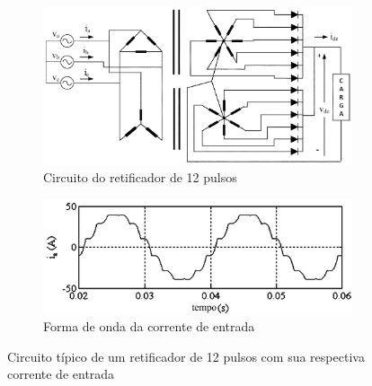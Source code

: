 \begin{figure}[!htbp] %
	\centering
	\begin{subfigure}[b]{0.49\textwidth}
		\centering
		\includegraphics[width=\textwidth]{Cap2/Figuras/12_pulse_rectifier.png}
		\caption{Circuito do retificador de 12 pulsos \cite{Singh2008}} 
		\label{fig:12_pulse_rectifier}
	\end{subfigure}%
	\hfill
	\begin{subfigure}[b]{0.49\textwidth}  
		\centering 
		\includegraphics[width=\textwidth]{Cap2/Figuras/12_pulse_wave.png}
		\caption{Forma de onda da corrente de entrada \cite{Singh2008}}    
		\label{fig:12_pulse_wave}
	\end{subfigure}%
	\caption{Circuito típico de um retificador de 12 pulsos com sua respectiva corrente de entrada}
	\label{fig:12_pulse}
\end{figure}

